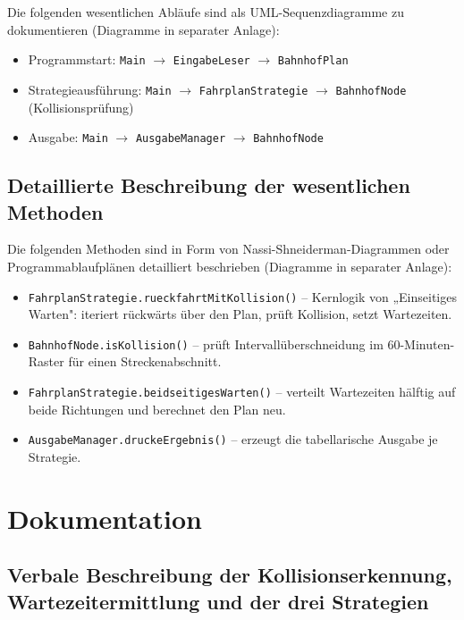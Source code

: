 \documentclass[12pt,a4paper]{article}
\begin{document}
Die folgenden wesentlichen Abläufe sind als UML-Sequenzdiagramme zu dokumentieren
(Diagramme in separater Anlage):

\begin{itemize}
  \item Programmstart: \texttt{Main} $\to$ \texttt{EingabeLeser} $\to$ \texttt{BahnhofPlan}
  \item Strategieausführung: \texttt{Main} $\to$ \texttt{FahrplanStrategie}
        $\to$ \texttt{BahnhofNode} (Kollisionsprüfung)
  \item Ausgabe: \texttt{Main} $\to$ \texttt{AusgabeManager} $\to$ \texttt{BahnhofNode}
\end{itemize}

\subsection{Detaillierte Beschreibung der wesentlichen Methoden}

Die folgenden Methoden sind in Form von Nassi-Shneiderman-Diagrammen oder
Programmablaufplänen detailliert beschrieben (Diagramme in separater Anlage):

\begin{itemize}
  \item \texttt{FahrplanStrategie.rueckfahrtMitKollision()} -- Kernlogik von
        „Einseitiges Warten": iteriert rückwärts über den Plan, prüft Kollision,
        setzt Wartezeiten.
  \item \texttt{BahnhofNode.isKollision()} -- prüft Intervallüberschneidung im
        60-Minuten-Raster für einen Streckenabschnitt.
  \item \texttt{FahrplanStrategie.beidseitigesWarten()} -- verteilt Wartezeiten
        hälftig auf beide Richtungen und berechnet den Plan neu.
  \item \texttt{AusgabeManager.druckeErgebnis()} -- erzeugt die tabellarische
        Ausgabe je Strategie.
\end{itemize}

\section{Dokumentation}

\subsection{Verbale Beschreibung der Kollisionserkennung, Wartezeitermittlung
            und der drei Strategien}
\end{document}
